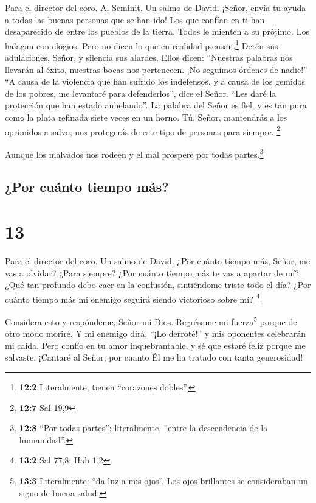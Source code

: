 Para el director del coro. Al Seminit. Un salmo de David. 
¡Señor, envía tu ayuda a todas las buenas personas que se han ido! Los
que confían en ti han desaparecido de entre los pueblos de la tierra.
 Todos le mienten a su prójimo. Los halagan con elogios.
Pero no dicen lo que en realidad piensan.\footnote{\textbf{12:2}
  Literalmente, tienen ``corazones dobles''.}  Detén sus
adulaciones, Señor, y silencia sus alardes.  Ellos dicen:
``Nuestras palabras nos llevarán al éxito, nuestras bocas nos
pertenecen. ¡No seguimos órdenes de nadie!''  ``A causa de
la violencia que han sufrido los indefensos, y a causa de los gemidos de
los pobres, me levantaré para defenderlos'', dice el Señor. ``Les daré
la protección que han estado anhelando''.  La palabra del
Señor es fiel, y es tan pura como la plata refinada siete veces en un
horno.  Tú, Señor, mantendrás a los oprimidos a salvo; nos
protegerás de este tipo de personas para siempre. \footnote{\textbf{12:7}
  Sal 19,9}

 Aunque los malvados nos rodeen y el mal prospere por
todas partes.\footnote{\textbf{12:8} ``Por todas partes'': literalmente,
  ``entre la descendencia de la humanidad''.}

\hypertarget{por-cuuxe1nto-tiempo-muxe1s}{%
\subsection{¿Por cuánto tiempo más?}\label{por-cuuxe1nto-tiempo-muxe1s}}

\hypertarget{section-12}{%
\section{13}\label{section-12}}

Para el director del coro. Un salmo de David.  ¿Por cuánto
tiempo más, Señor, me vas a olvidar? ¿Para siempre? ¿Por cuánto tiempo
más te vas a apartar de mí?  ¿Qué tan profundo debo caer
en la confusión, sintiéndome triste todo el día? ¿Por cuánto tiempo más
mi enemigo seguirá siendo victorioso sobre mí? \footnote{\textbf{13:2}
  Sal 77,8; Hab 1,2}

 Considera esto y respóndeme, Señor mi Dios. Regrésame mi
fuerza\footnote{\textbf{13:3} Literalmente: ``da luz a mis ojos''. Los
  ojos brillantes se consideraban un signo de buena salud.} porque de
otro modo moriré.  Y mi enemigo dirá, ``¡Lo derroté!'' y
mis oponentes celebrarán mi caída.  Pero confío en tu amor
inquebrantable, y sé que estaré feliz porque me salvaste. 
¡Cantaré al Señor, por cuanto Él me ha tratado con tanta generosidad!

